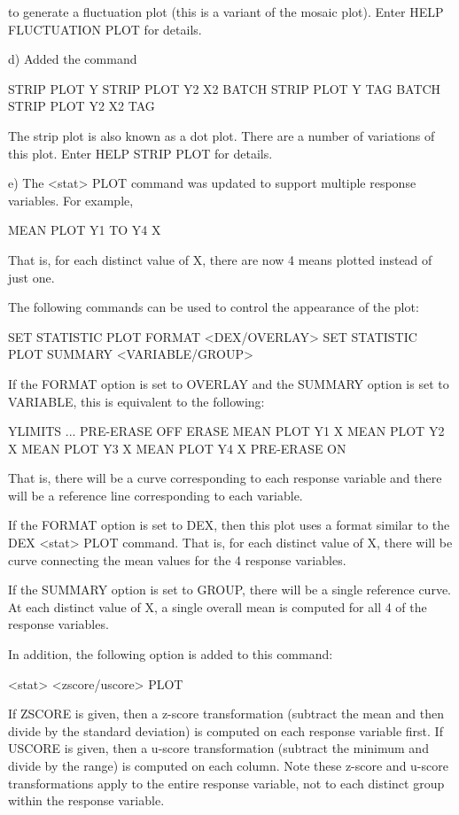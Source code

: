 {       to generate a fluctuation plot (this is a variant
       of the mosaic plot).  Enter HELP FLUCTUATION PLOT for
       details.

    d) Added the command

          STRIP PLOT Y
          STRIP PLOT Y2 X2
          BATCH STRIP PLOT Y TAG
          BATCH STRIP PLOT Y2 X2 TAG

       The strip plot is also known as a dot plot.  There
       are a number of variations of this plot.  Enter
       HELP STRIP PLOT for details.

    e) The <stat> PLOT command was updated to support multiple
       response variables.  For example,

           MEAN PLOT Y1 TO Y4 X

       That is, for each distinct value of X, there are now
       4 means plotted instead of just one.

       The following commands can be used to control the
       appearance of the plot:

           SET STATISTIC PLOT FORMAT   <DEX/OVERLAY>
           SET STATISTIC PLOT SUMMARY  <VARIABLE/GROUP>

    If the FORMAT option is set to OVERLAY and the SUMMARY option
    is set to VARIABLE, this is equivalent to the following:

        YLIMITS ...
        PRE-ERASE OFF
        ERASE
        MEAN PLOT Y1 X
        MEAN PLOT Y2 X
        MEAN PLOT Y3 X
        MEAN PLOT Y4 X
        PRE-ERASE ON

    That is, there will be a curve corresponding to each
    response variable and there will be a reference line
    corresponding to each variable.

    If the FORMAT option is set to DEX, then this plot uses a
    format similar to the DEX <stat> PLOT command.  That is, for
    each distinct value of X, there will be curve connecting the
    mean values for the 4 response variables.

    If the SUMMARY option is set to GROUP, there will be a single
    reference curve.  At each distinct value of X, a single overall
    mean is computed for all 4 of the response variables.

    In addition, the following option is added to this command:

        <stat> <zscore/uscore> PLOT

    If ZSCORE is given, then a z-score transformation (subtract the
    mean and then divide by the standard deviation) is computed
    on each response variable first.  If USCORE is given, then a
    u-score transformation (subtract the minimum and divide by the
    range) is computed on each column.  Note these z-score and
    u-score transformations apply to the entire response variable, not
    to each distinct group within the response variable.

}

